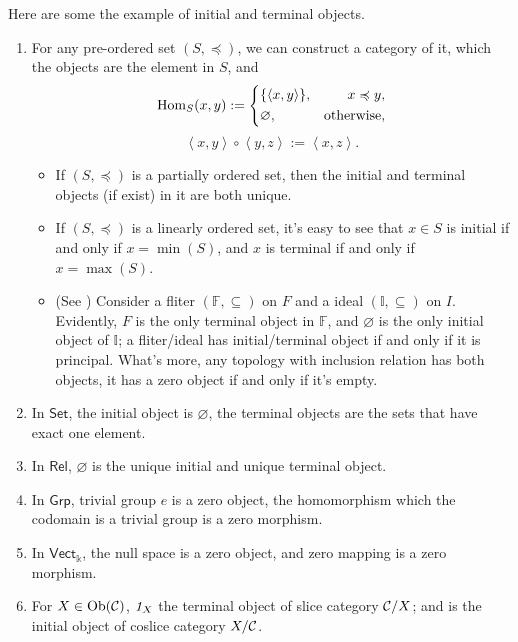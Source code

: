 \documentclass{article}
\begin{document}
\begin{exm}
	Here are some the example of initial and terminal objects.
	\begin{enumerate}
		\item For any pre-ordered set $(S,\preccurlyeq)$, we can construct a category of it, which the objects are the element in $S$, and
			$$\mathrm{Hom}_S(x,y):=\left\{\begin{aligned} & \{\left<x,y\right>\}, & x\preccurlyeq y,\\ & \varnothing, & \text{otherwise},\\ \end{aligned}\right.$$ 
			$$\left<x,y\right>\circ\left<y,z\right>:=\left<x,z\right>.$$
		\begin{itemize}
			\item If $(S,\preccurlyeq)$ is a partially ordered set, then the initial and terminal objects (if exist) in it are both unique.
			\item If $(S,\preccurlyeq)$ is a linearly ordered set, it's easy to see that $x\in S$ is initial if and only if $x=\min(S)$, and $x$ is terminal if and only if $x=\max(S)$.
			\item (See \cite[\S7]{cat-1}) Consider a f{}liter $(\mathbb{F},\subseteq)$ on $F$ and a ideal $(\mathbb{I},\subseteq)$ on $I$. Evidently, $F$ is the only terminal object in $\mathbb{F}$, and $\varnothing$ is the only initial object of $\mathbb{I}$; a f{}liter/ideal has initial/terminal object if and only if it is principal. What's more, any topology with inclusion relation has both objects, it has a zero object if and only if it's empty.
		\end{itemize}
		
		\item In $\mathsf{Set}$, the initial object is $\varnothing$, the terminal objects are the sets that have exact one element.
		
		\item In $\mathsf{Rel}$, $\varnothing$ is the unique initial and unique terminal object.
		
		\item In $\mathsf{Grp}$, trivial group ${e}$ is a zero object, the homomorphism which the codomain is a trivial group is a zero morphism.
		
		\item In $\mathsf{Vect}_\Bbbk$, the null space is a zero object, and zero mapping is a zero morphism.
		
		\item For $X\in\mathrm{Ob}(\mathcal{C})$, $\mathit{1}_X$ the terminal object of slice category $\mathcal{C}/X$; and is the initial object of coslice category $X/\mathcal{C}$.
	\end{enumerate}
\end{exm}
\end{document}
